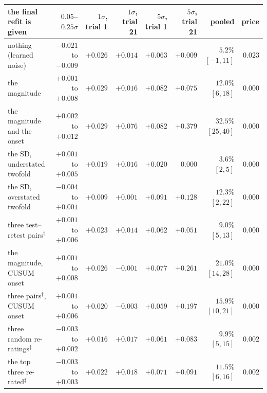 \begin{tabular}{lrrrrrrr}
\toprule
the final refit is given & $0.05$--$0.25\sigma$ & $1\sigma$, trial 1 & $1\sigma$, trial 21 & $5\sigma$, trial 1 & $5\sigma$, trial 21 & pooled & price \\
\midrule
nothing (learned noise) & $-0.021$ to $-0.009$ & $+0.026$ & $+0.014$ & $+0.063$ & $+0.009$ & $5.2\%$ $[-1, 11]$ & $0.023$ \\
the magnitude & $+0.001$ to $+0.008$ & $+0.029$ & $+0.016$ & $+0.082$ & $+0.075$ & $12.0\%$ $[6, 18]$ & $0.000$ \\
the magnitude and the onset & $+0.002$ to $+0.012$ & $+0.029$ & $+0.076$ & $+0.082$ & $+0.379$ & $32.5\%$ $[25, 40]$ & $0.000$ \\
the SD, understated twofold & $+0.001$ to $+0.005$ & $+0.019$ & $+0.016$ & $+0.020$ & $0.000$ & $3.6\%$ $[2, 5]$ & $0.000$ \\
the SD, overstated twofold & $-0.004$ to $+0.001$ & $+0.009$ & $+0.001$ & $+0.091$ & $+0.128$ & $12.3\%$ $[2, 22]$ & $0.000$ \\
three test--retest pairs$^\dagger$ & $+0.001$ to $+0.006$ & $+0.023$ & $+0.014$ & $+0.062$ & $+0.051$ & $9.0\%$ $[5, 13]$ & $0.000$ \\
the magnitude, CUSUM onset & $+0.001$ to $+0.008$ & $+0.026$ & $-0.001$ & $+0.077$ & $+0.261$ & $21.0\%$ $[14, 28]$ & $0.000$ \\
three pairs$^\dagger$, CUSUM onset & $+0.001$ to $+0.006$ & $+0.020$ & $-0.003$ & $+0.059$ & $+0.197$ & $15.9\%$ $[10, 21]$ & $0.000$ \\
three random re-ratings$^\ddagger$ & $-0.003$ to $+0.002$ & $+0.016$ & $+0.017$ & $+0.061$ & $+0.083$ & $9.9\%$ $[5, 15]$ & $0.002$ \\
the top three re-rated$^\ddagger$ & $-0.003$ to $+0.003$ & $+0.022$ & $+0.018$ & $+0.071$ & $+0.091$ & $11.5\%$ $[6, 16]$ & $0.002$ \\
\bottomrule
\end{tabular}
